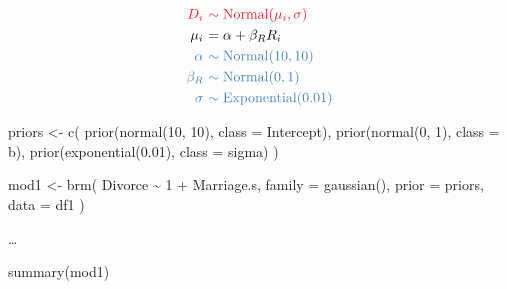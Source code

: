 \documentclass[
  a4paper,11pt,twoside,onecolumn,openright,final,oldfontcommands]{memoir}
\newenvironment{Shaded}{\begin{snugshade}}{\end{snugshade}}
\newcommand{\AttributeTok}[1]{\textcolor[rgb]{0.77,0.63,0.00}{#1}}
\newcommand{\DecValTok}[1]{\textcolor[rgb]{0.00,0.00,0.81}{#1}}
\newcommand{\FloatTok}[1]{\textcolor[rgb]{0.00,0.00,0.81}{#1}}
\newcommand{\FunctionTok}[1]{\textcolor[rgb]{0.00,0.00,0.00}{#1}}
\newcommand{\NormalTok}[1]{#1}
\newcommand{\OtherTok}[1]{\textcolor[rgb]{0.56,0.35,0.01}{#1}}
\newcommand{\SpecialCharTok}[1]{\textcolor[rgb]{0.00,0.00,0.00}{#1}}
\theoremstyle{definition}
\theoremstyle{definition}
\theoremstyle{definition}
\theoremstyle{definition}
\theoremstyle{remark}
\begin{document}
\[
\begin{aligned}
\color{orangered}{D_{i}} \ &\color{orangered}{\sim \mathrm{Normal}(\mu_{i}, \sigma)} \\
\color{black}{\mu_{i}} \ &\color{black}{= \alpha + \beta_{R} R_{i}} \\
\color{steelblue}{\alpha} \ &\color{steelblue}{\sim \mathrm{Normal}(10, 10)} \\
\color{steelblue}{\beta_{R}} \ &\color{steelblue}{\sim \mathrm{Normal}(0, 1)} \\
\color{steelblue}{\sigma} \ &\color{steelblue}{\sim \mathrm{Exponential}(0.01)} \\
\end{aligned}
\]

\begin{Shaded}
\begin{Highlighting}[]
\NormalTok{priors }\OtherTok{\textless{}{-}} \FunctionTok{c}\NormalTok{(}
  \FunctionTok{prior}\NormalTok{(}\FunctionTok{normal}\NormalTok{(}\DecValTok{10}\NormalTok{, }\DecValTok{10}\NormalTok{), }\AttributeTok{class =}\NormalTok{ Intercept),}
  \FunctionTok{prior}\NormalTok{(}\FunctionTok{normal}\NormalTok{(}\DecValTok{0}\NormalTok{, }\DecValTok{1}\NormalTok{), }\AttributeTok{class =}\NormalTok{ b),}
  \FunctionTok{prior}\NormalTok{(}\FunctionTok{exponential}\NormalTok{(}\FloatTok{0.01}\NormalTok{), }\AttributeTok{class =}\NormalTok{ sigma)}
\NormalTok{  )}

\NormalTok{mod1 }\OtherTok{\textless{}{-}} \FunctionTok{brm}\NormalTok{(}
\NormalTok{  Divorce }\SpecialCharTok{\textasciitilde{}} \DecValTok{1} \SpecialCharTok{+}\NormalTok{ Marriage.s,}
  \AttributeTok{family =} \FunctionTok{gaussian}\NormalTok{(),}
  \AttributeTok{prior =}\NormalTok{ priors,}
  \AttributeTok{data =}\NormalTok{ df1}
\NormalTok{  )}
\end{Highlighting}
\end{Shaded}

\ldots{}

\begin{Shaded}
\begin{Highlighting}[]
\FunctionTok{summary}\NormalTok{(mod1)}
\end{Highlighting}
\end{Shaded}
\end{document}
